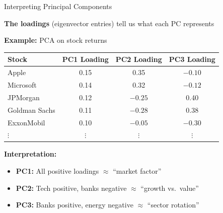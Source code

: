 \documentclass[10pt]{beamer}
\begin{document}
\begin{frame}{Interpreting Principal Components}

  \textbf{The loadings} (eigenvector entries) tell us what each PC represents

  \vspace{1em}
  \textbf{Example:} PCA on stock returns

  \vspace{0.5em}
  \begin{center}
  \begin{tabular}{lccc}
    \toprule
    \textbf{Stock} & \textbf{PC1 Loading} & \textbf{PC2 Loading} & \textbf{PC3 Loading} \\
    \midrule
    Apple & 0.15 & 0.35 & $-0.10$ \\
    Microsoft & 0.14 & 0.32 & $-0.12$ \\
    JPMorgan & 0.12 & $-0.25$ & 0.40 \\
    Goldman Sachs & 0.11 & $-0.28$ & 0.38 \\
    ExxonMobil & 0.10 & $-0.05$ & $-0.30$ \\
    $\vdots$ & $\vdots$ & $\vdots$ & $\vdots$ \\
    \bottomrule
  \end{tabular}
  \end{center}

  \vspace{0.5em}
  \textbf{Interpretation:}
  \begin{itemize}
    \item \textbf{PC1:} All positive loadings $\approx$ ``market factor''
    \item \textbf{PC2:} Tech positive, banks negative $\approx$ ``growth vs.\ value''
    \item \textbf{PC3:} Banks positive, energy negative $\approx$ ``sector rotation''
  \end{itemize}
\end{frame}

\end{document}
